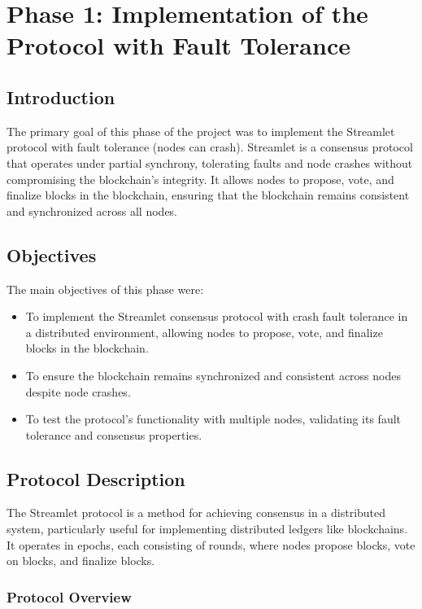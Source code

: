 \chapter{Phase 1: Implementation of the Protocol with Fault Tolerance}

\section{Introduction}

The primary goal of this phase of the project was to implement the Streamlet protocol with fault tolerance (nodes can crash). Streamlet is a consensus protocol that operates under partial synchrony, tolerating faults and node crashes without compromising the blockchain's integrity. It allows nodes to propose, vote, and finalize blocks in the blockchain, ensuring that the blockchain remains consistent and synchronized across all nodes.

\section{Objectives}

The main objectives of this phase were:
\begin{itemize}
    \item To implement the Streamlet consensus protocol with crash fault tolerance in a distributed environment, allowing nodes to propose, vote, and finalize blocks in the blockchain.
    \item To ensure the blockchain remains synchronized and consistent across nodes despite node crashes.
    \item To test the protocol's functionality with multiple nodes, validating its fault tolerance and consensus properties.
\end{itemize}

\clearpage

\section{Protocol Description}

The Streamlet protocol is a method for achieving consensus in a distributed system, particularly useful for implementing distributed ledgers like blockchains. It operates in epochs, each consisting of rounds, where nodes propose blocks, vote on blocks, and finalize blocks.


\subsection*{Protocol Overview}

